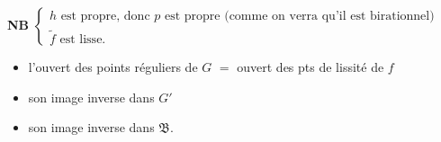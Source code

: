 \documentclass[11pt,a4paper]{article}
\begin{document}
\textbf{NB}
$\begin{cases}\text{$h$ est propre, donc $p$ est propre (comme on verra qu'il est birationnel)}\\ \text{$\tilde f$ est lisse.}\end{cases}$

\begin{itemize}
\item[$G^{\mathrm{reg}}$] l'ouvert des points réguliers de $G$ $=$ ouvert
des pts de lissité de $f$
\item[$G'^{\mathrm{reg}}$] son image inverse dans $G'$
\item[$\mathfrak{B}^{\mathrm{reg}}$] son image inverse dans $\mathfrak{B}$.
\end{itemize}
\end{document}

